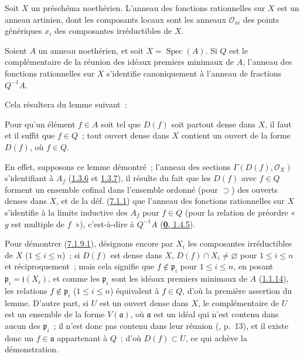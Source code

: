 \begin{corollary}[7.1.8]
\label{I.7.1.8-fr}
Soit $X$ un préschéma noethérien. L'anneau des fonctions rationnelles sur $X$
est un anneau artinien, dont les composants locaux sont les anneaux
$\mathscr{O}_{xi}$ des points génériques $x_i$ des composantes irréductibles
de $X$.
\end{corollary}

\begin{corollary}[7.1.9]
\label{I.7.1.9-fr}
Soient $A$ un anneau noethérien, et soit $X=\operatorname{Spec}(A)$. Si $Q$ est
le complémentaire de la réunion des idéaux premiers minimaux de $A$, l'anneau
des fonctions rationnelles sur $X$ s'identifie canoniquement à l'anneau de
fractions $Q^{-1}A$.
\end{corollary}

Cela résultera du lemme suivant~:

\begin{lemma}[7.1.9.1]
\label{I.7.1.9.1-fr}
Pour qu'un élément $f\in A$ soit tel que $D(f)$ soit partout dense dans $X$, il
faut et il suffit que $f\in Q$~; tout ouvert dense dans $X$ contient un ouvert
de la forme $D(f)$, où $f\in Q$.
\end{lemma}

En effet, supposons ce lemme démontré~; l'anneau des sections
$\Gamma(D(f),\mathscr{O}_X)$ s'identifiant à $A_f$
(\hyperref[I.1.3.6-fr]{1.3.6} et \hyperref[I.1.3.7-fr]{1.3.7}), il résulte du
fait que les $D(f)$ avec $f\in Q$ forment un ensemble cofinal dans l'ensemble
ordonné (pour $\supset$) des ouverts denses dans $X$, et de la déf.
(\hyperref[I.7.1.1-fr]{7.1.1}) que l'anneau des fonctions rationnelles sur $X$
s'identifie à la limite inductive des $A_f$ pour $f\in Q$ (pour la relation de
préordre «~$g$ est multiple de $f$~»), c'est-à-dire à $Q^{-1}A$
(\hyperref[0.1.4.5-fr]{\textbf{0}, 1.4.5}).

Pour démontrer (\hyperref[I.7.1.9.1-fr]{7.1.9.1}), désignons encore par $X_i$
les composantes irréductibles de $X$ ($1\leq i\leq n$)~; si $D(f)$ est dense
dans $X$, $D(f)\cap X_i\neq\varnothing$ pour $1\leq i\leq n$ et
réciproquement~; mais cela signifie que $f\notin\mathfrak{p}_i$ pour
$1\leq i\leq n$, en posant $\mathfrak{p}_i=\mathfrak{j}(X_i)$, et comme les
$\mathfrak{p}_i$ sont les idéaux premiers minimaux de $A$
(\hyperref[I.1.1.14-fr]{1.1.14}), les relations
$f\notin\mathfrak{p}_i$ ($1\leq i\leq n$) équivalent à $f\in Q$, d'où la
première assertion du lemme. D'autre part, si $U$ est un ouvert dense dans $X$,
le complémentaire de $U$ est un ensemble de la forme $V(\mathfrak{a})$, où
$\mathfrak{a}$ est un idéal qui n'est contenu dans aucun des $\mathfrak{p}_i$~;
il n'est donc pas contenu dans leur réunion (\cite{I-10}, p.~13), et il existe
donc un $f\in\mathfrak{a}$ appartenant à $Q$~; d'où $D(f)\subset U$, ce qui
achève la démonstration.

